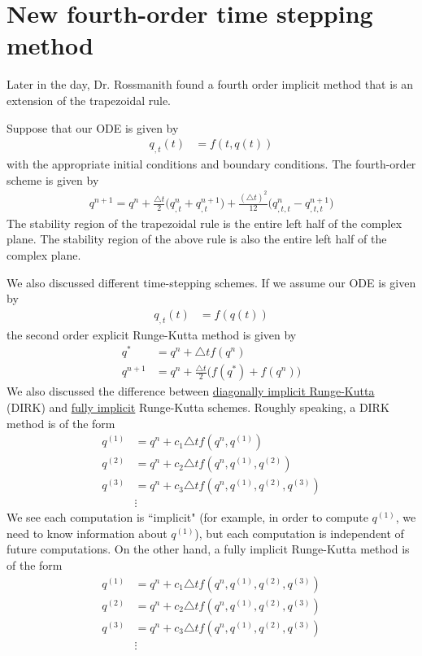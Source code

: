 \documentclass[12pt]{article}
\begin{document}
\section*{New fourth-order time stepping method}
Later in the day, Dr. Rossmanith found a fourth order implicit method that is an extension of the trapezoidal rule. 
\par 
Suppose that our ODE is given by
\begin{align*}
	q_{, t}(t) & = f(t, q(t))
\end{align*}
with the appropriate initial conditions and boundary conditions.
The fourth-order scheme is given by
\begin{align*}
	q^{n+1} = q^{n} + \frac{\triangle t}{2} \Bigg( q_{, t}^{n} + q_{, t}^{n + 1} \Bigg)
					+ \frac{(\triangle t)^{2}}{12} \Bigg( q_{, t, t}^{n} - q_{, t, t}^{n + 1} \Bigg)
\end{align*}
The stability region of the trapezoidal rule is the entire left half of the complex plane.
The stability region of the above rule is also the entire left half of the complex plane.
\par 
We also discussed different time-stepping schemes.
If we assume our ODE is given by
\begin{align*}
	q_{, t}(t) & = f(q(t))
\end{align*}
the second order explicit Runge-Kutta method is given by 
\begin{align*}
	q^{*} & = q^{n} + \triangle t f(q^{n}) \\
	q^{n+1} & = q^{n} + \frac{\triangle t}{2} \Big( f(q^{*}) + f(q^{n}) \Big) 
\end{align*}
We also discussed the difference between \underline{diagonally implicit Runge-Kutta} (DIRK) and \underline{fully implicit} Runge-Kutta schemes.
Roughly speaking, a DIRK method is of the form
\begin{align*}
	q^{(1)} & = q^{n} + c_{1} \triangle t f(q^{n}, q^{(1)}) \\
	q^{(2)} & = q^{n} + c_{2} \triangle t f(q^{n}, q^{(1)}, q^{(2)}) \\
	q^{(3)} & = q^{n} + c_{3} \triangle t f(q^{n}, q^{(1)}, q^{(2)}, q^{(3)}) \\
	        & \vdots 
\end{align*}
We see each computation is ``implicit" (for example, in order to compute $q^{(1)}$, we need to know information about $q^{(1)}$), but each computation is independent of future computations.
On the other hand, a fully implicit Runge-Kutta method is of the form
\begin{align*}
	q^{(1)} & = q^{n} + c_{1} \triangle t f(q^{n}, q^{(1)}, q^{(2)}, q^{(3)}) \\
	q^{(2)} & = q^{n} + c_{2} \triangle t f(q^{n}, q^{(1)}, q^{(2)}, q^{(3)}) \\
	q^{(3)} & = q^{n} + c_{3} \triangle t f(q^{n}, q^{(1)}, q^{(2)}, q^{(3)}) \\
	        & \vdots
\end{align*}
\end{document}
